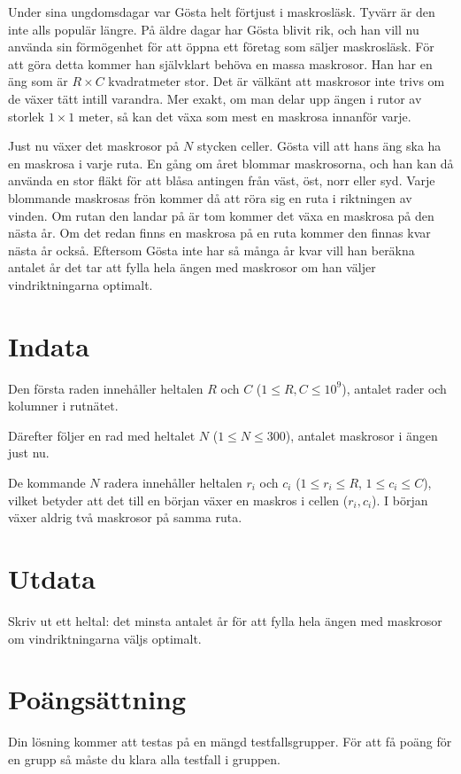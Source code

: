 \noindent

Under sina ungdomsdagar var Gösta helt förtjust i maskrosläsk. Tyvärr är den inte alls populär längre. 
På äldre dagar har Gösta blivit rik, och han vill nu använda sin förmögenhet för att öppna ett företag
som säljer maskrosläsk. För att göra detta kommer han självklart behöva en massa maskrosor. Han har en
äng som är $R \times C$ kvadratmeter stor. Det är välkänt att maskrosor inte trivs om de växer tätt
intill varandra. Mer exakt, om man delar upp ängen i rutor av storlek $1 \times 1$ meter, så kan det växa
som mest en maskrosa innanför varje.

Just nu växer det maskrosor på $N$ stycken celler. Gösta vill att hans äng ska ha en maskrosa i varje ruta. 
En gång om året blommar maskrosorna, och han kan då använda en stor fläkt för att blåsa antingen från väst,
öst, norr eller syd. Varje blommande maskrosas frön kommer då att röra sig en ruta i riktningen av vinden.
Om rutan den landar på är tom kommer det växa en maskrosa på den nästa år. Om det redan finns en maskrosa
på en ruta kommer den finnas kvar nästa år också. Eftersom Gösta inte har så många år kvar vill han
beräkna antalet år det tar att fylla hela ängen med maskrosor om han väljer vindriktningarna optimalt.

\section*{Indata}
Den första raden innehåller heltalen $R$ och $C$ ($1 \leq R,C \leq 10^9$), antalet rader och kolumner i rutnätet.

Därefter följer en rad med heltalet $N$ ($1 \leq N \leq 300$), antalet maskrosor i ängen just nu.

De kommande $N$ radera innehåller heltalen $r_i$ och $c_i$ ($1 \leq r_i \leq R$, $1 \leq c_i \leq C$), vilket betyder
att det till en början växer en maskros i cellen ($r_i, c_i$). I början växer aldrig två maskrosor på samma ruta.

\section*{Utdata}
Skriv ut ett heltal: det minsta antalet år för att fylla hela ängen med maskrosor om vindriktningarna väljs optimalt.

\section*{Poängsättning}
Din lösning kommer att testas på en mängd testfallsgrupper.
För att få poäng för en grupp så måste du klara alla testfall i gruppen.

